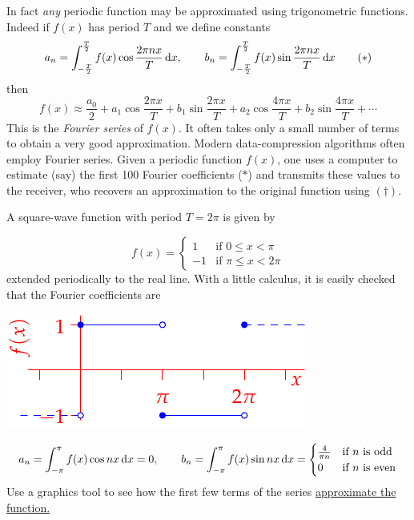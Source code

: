 In fact \emph{any} periodic function may be approximated using trigonometric functions. Indeed if $f(x)$ has period $T$ and we define constants
\[
	a_n=\int_{-\frac T2}^{\frac T2} f(x)\cos\frac{2\pi nx}T\,{\mathrm{d} x},\qquad 
	b_n=\int_{-\frac T2}^{\frac T2} f(x)\sin\frac{2\pi nx}T\,{\mathrm{d} x}
	\tag{$\ast$}
\]
then
\[
	f(x)\approx \frac{a_0}2+a_1\cos\frac{2\pi x}T +b_1\sin\frac{2\pi x}T +a_2\cos\frac{4\pi x}T +b_2\sin\frac{4\pi x}T +\cdots \tag{$\dag$}
\]
This is the \emph{Fourier series} of $f(x)$. It often takes only a small number of terms to obtain a very good approximation. Modern data-compression algorithms often employ Fourier series. Given a periodic function $f(x)$, one uses a computer to estimate (say) the first 100 Fourier coefficients ($\ast$) and transmits these values to the receiver, who recovers an approximation to the original function using $(\dag)$.

\begin{example}{}{}
	A square-wave function with period $T=2\pi$ is given by\par
	\begin{minipage}[t]{0.6\linewidth}\vspace{-10pt}
		\[
			f(x)=
			\begin{cases}
				1&\text{if }0\le x<\pi\\
				-1&\text{if }\pi\le x<2\pi
			\end{cases}
		\]
		extended periodically to the real line. With a little calculus, it is easily checked that the Fourier coefficients are
	\end{minipage}
	\hfill
	\begin{minipage}[t]{0.39\linewidth}\vspace{-2pt}
		\flushright\includegraphics[scale=0.95]{square-wave}
	\end{minipage}\par
	\[
		a_n=\int_{-\pi}^{\pi} f(x)\cos nx\,{\mathrm{d} x}=0,\qquad 
		b_n=\int_{-\pi}^{\pi} f(x)\sin nx\,{\mathrm{d} x}=
		\begin{cases}
			\frac 4{\pi n}&\text{if $n$ is odd}\\
			0&\text{if $n$ is even}
		\end{cases}
	\]
	Use a graphics tool to see how the first few terms of the series \href{https://www.math.uci.edu/~ndonalds/math121b/orth-fourier.html}{approximate the function.}
\end{example}


